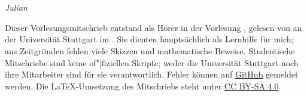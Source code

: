 \part{\vorlesung{}}\par
\thispagestyle{empty}

\emph{Julian }

\vspace*{1em}

Dieser Vorlesungsmitschrieb entstand als Hörer in der Vorlesung \vorlesung{},
gelesen von \dozent{} an der Universität Stuttgart im \semester{}.
Sie dienten hauptsächlich als Lernhilfe für mich;
aus Zeitgründen fehlen viele Skizzen und mathematische Beweise.
Studentische Mitschriebe sind keine of"|fiziellen Skripte;
weder die Universität Stuttgart noch ihre Mitarbeiter sind für sie verantwortlich.
Fehler können auf \href{https://github.com/valentjn/class-notes}{GitHub} gemeldet werden.
Die \LaTeX{}-Umsetzung des Mitschriebs steht unter
\href{https://creativecommons.org/licenses/by-sa/4.0/}{CC BY-SA 4.0}.

{%
  \renewcommand*{\chaptermarkformat}{}

  \renewcommand*{\contentsname}{Inhaltsverzeichnis dieser Vorlesung}

  \localtableofcontents%
}

\pagebreak
